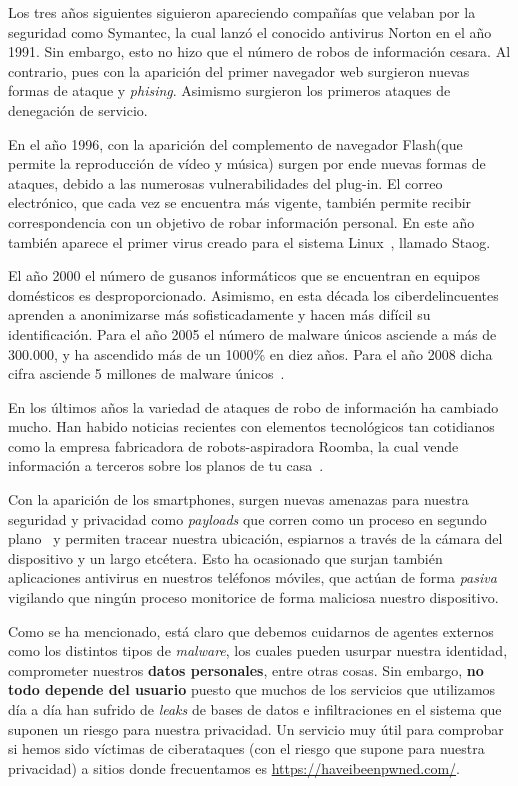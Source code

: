 Los tres años siguientes siguieron apareciendo compañías que velaban por la seguridad como Symantec, la cual lanzó el conocido antivirus Norton en el año 1991.
Sin embargo, esto no hizo que el número de robos de información cesara. Al contrario, pues con la aparición del primer navegador web surgieron nuevas formas de ataque y \textit{phising}. Asimismo surgieron los primeros ataques de denegación de servicio.

En el año 1996, con la aparición del complemento de navegador Flash(que permite la reproducción de vídeo y música) surgen por ende nuevas formas de ataques, debido a las numerosas vulnerabilidades del plug-in. El correo electrónico, que cada vez se encuentra más vigente, también permite recibir correspondencia con un objetivo de robar información personal. En este año también aparece el primer virus creado para el sistema Linux~\cite{article:staog}, llamado Staog.

El año 2000 el número de gusanos informáticos que se encuentran en equipos domésticos es desproporcionado. Asimismo, en esta década los ciberdelincuentes aprenden a anonimizarse más sofisticadamente y hacen más difícil su identificación.
Para el año 2005 el número de malware únicos asciende a más de 300.000, y ha ascendido más de un 1000\% en diez años. Para el año 2008 dicha cifra asciende 5 millones de malware únicos~\cite{article:number_malware}.

En los últimos años la variedad de ataques de robo de información ha cambiado mucho. Han habido noticias recientes con elementos tecnológicos tan cotidianos como la empresa fabricadora de robots-aspiradora Roomba, la cual vende información a terceros sobre los planos de tu casa~\cite{article:roomba}. 

Con la aparición de los smartphones, surgen nuevas amenazas para nuestra seguridad y privacidad como \textit{payloads} que corren como un proceso en segundo plano~\cite{article:android} y permiten tracear nuestra ubicación, espiarnos a través de la cámara del dispositivo y un largo etcétera. Esto ha ocasionado que surjan también aplicaciones antivirus en nuestros teléfonos móviles, que actúan de forma \textit{pasiva} vigilando que ningún proceso monitorice de forma maliciosa nuestro dispositivo. 

Como se ha mencionado, está claro que debemos cuidarnos de agentes externos como los distintos tipos de \textit{malware}, los cuales pueden usurpar nuestra identidad, comprometer nuestros \textbf{datos personales}, entre otras cosas. 
Sin embargo, \textbf{no todo depende del usuario }puesto que muchos de los servicios que utilizamos día a día han sufrido de \textit{leaks} de bases de datos e infiltraciones en el sistema que suponen un riesgo para nuestra privacidad. Un servicio muy útil para comprobar si hemos sido víctimas de ciberataques (con el riesgo que supone para nuestra privacidad) a sitios donde frecuentamos es \url{https://haveibeenpwned.com/}.

